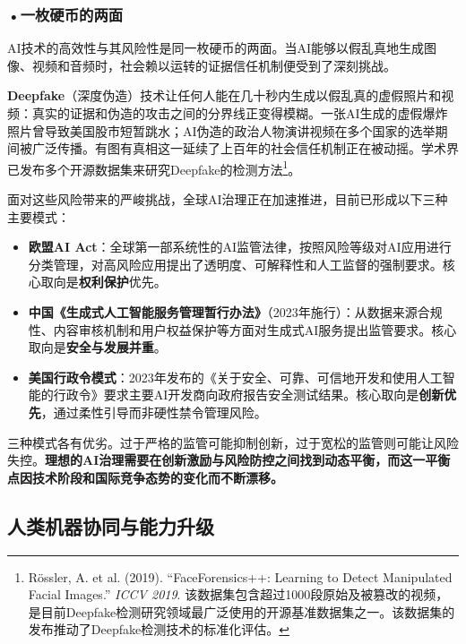 \subsubsection*{\textbf{•一枚硬币的两面}}

AI技术的高效性与其风险性是同一枚硬币的两面。当AI能够以假乱真地生成图像、视频和音频时，社会赖以运转的证据信任机制便受到了深刻挑战。

\textbf{Deepfake}（深度伪造）技术让任何人能在几十秒内生成以假乱真的虚假照片和视频：真实的证据和伪造的攻击之间的分界线正变得模糊。一张AI生成的虚假爆炸照片曾导致美国股市短暂跳水；AI伪造的政治人物演讲视频在多个国家的选举期间被广泛传播。有图有真相这一延续了上百年的社会信任机制正在被动摇。学术界已发布多个开源数据集来研究Deepfake的检测方法\footnote{Rössler, A. et al. (2019). ``FaceForensics++: Learning to Detect Manipulated Facial Images.'' \emph{ICCV 2019}. 该数据集包含超过1000段原始及被篡改的视频，是目前Deepfake检测研究领域最广泛使用的开源基准数据集之一。该数据集的发布推动了Deepfake检测技术的标准化评估。}。

面对这些风险带来的严峻挑战，全球AI治理正在加速推进，目前已形成以下三种主要模式：

\begin{itemize}[leftmargin=*, itemsep=3pt]
\item \textbf{欧盟AI Act}：全球第一部系统性的AI监管法律，按照风险等级对AI应用进行分类管理，对高风险应用提出了透明度、可解释性和人工监督的强制要求。核心取向是\textbf{权利保护}优先。
\item \textbf{中国《生成式人工智能服务管理暂行办法》}（2023年施行）：从数据来源合规性、内容审核机制和用户权益保护等方面对生成式AI服务提出监管要求。核心取向是\textbf{安全与发展并重}。
\item \textbf{美国行政令模式}：2023年发布的《关于安全、可靠、可信地开发和使用人工智能的行政令》要求主要AI开发商向政府报告安全测试结果。核心取向是\textbf{创新优先}，通过柔性引导而非硬性禁令管理风险。
\end{itemize}

三种模式各有优劣。过于严格的监管可能抑制创新，过于宽松的监管则可能让风险失控。\textbf{理想的AI治理需要在创新激励与风险防控之间找到动态平衡，而这一平衡点因技术阶段和国际竞争态势的变化而不断漂移。}

\subsection{人类机器协同与能力升级}

